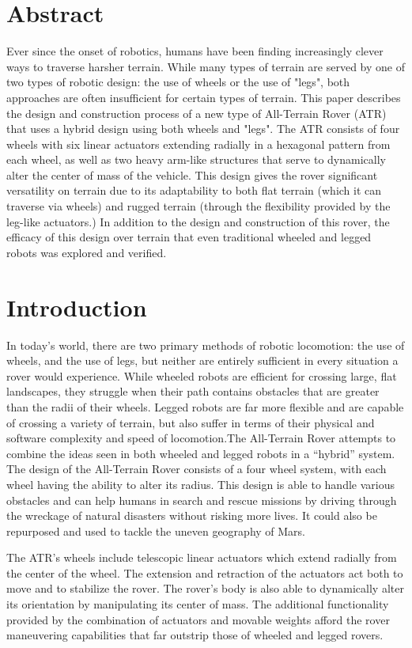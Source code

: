 \documentclass[11pt]{article}
\numberwithin{figure}{section}
\begin{document}
\begin{multicols}{2}
\section*{Abstract}
Ever since the onset of robotics, humans have been finding increasingly clever ways to traverse harsher terrain. While many types of terrain are served by one of two types of robotic design: the use of wheels or the use of "legs", both approaches are often insufficient for certain types of terrain. This paper describes the design and construction process of a new type of All-Terrain Rover (ATR) that uses a hybrid design using both wheels and "legs". The ATR consists of four wheels with six linear actuators extending radially in a hexagonal pattern from each wheel, as well as two heavy arm-like structures that serve to dynamically alter the center of mass of the vehicle. This design gives the rover significant versatility on terrain due to its adaptability to both flat terrain (which it can traverse via wheels) and rugged terrain (through the flexibility provided by the leg-like actuators.) In addition to the design and construction of this rover, the efficacy of this design over terrain that even traditional wheeled and legged robots was explored and verified.
\section{Introduction}
In today’s world, there are two primary methods of robotic locomotion: the use of wheels, and the use of legs, but neither are entirely sufficient in every situation a rover would experience. While wheeled robots are efficient for crossing large, flat landscapes, they struggle when their path contains obstacles that are greater than the radii of their wheels. Legged robots are far more flexible and are capable of crossing a variety of terrain, but also suffer in terms of their physical and software complexity and speed of locomotion.The All-Terrain Rover attempts to combine the ideas seen in both wheeled and legged robots in a “hybrid” system. The design of the All-Terrain Rover consists of a four wheel system, with each wheel having the ability to alter its radius. This design is able to handle various obstacles and can help humans in search and rescue missions by driving through the wreckage of natural disasters without risking more lives. It could also be repurposed and used to tackle the uneven geography of Mars.

The ATR’s wheels include telescopic linear actuators which extend radially from the center of the wheel. The extension and retraction of the actuators act both to move and to stabilize the rover. The rover’s body is also able to dynamically alter its orientation by manipulating its center of mass. The additional functionality provided by the combination of actuators and movable weights afford the rover maneuvering capabilities that far outstrip those of wheeled and legged rovers.


\end{multicols}
\end{document}
